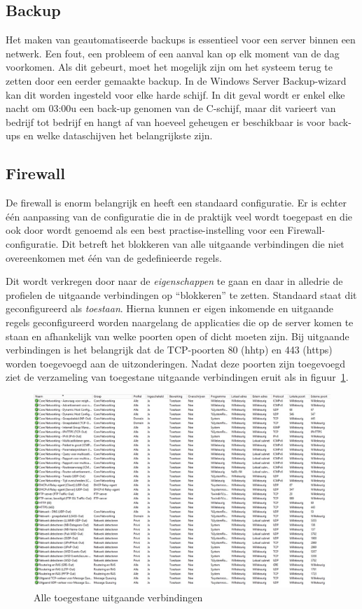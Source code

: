 \documentclass[pdftex,a4paper,12pt]{report}
\begin{document}
\subsection{Backup}
Het maken van geautomatiseerde backups is essentieel voor een server binnen een netwerk. Een fout, een probleem of een aanval kan op elk moment van de dag voorkomen. Als dit gebeurt, moet het mogelijk zijn om het systeem terug te zetten door een eerder gemaakte backup. In de Windows Server Backup-wizard kan dit worden ingesteld voor elke harde schijf. In dit geval wordt er enkel elke nacht om 03:00u een back-up genomen van de C-schijf, maar dit varieert van bedrijf tot bedrijf en hangt af van hoeveel geheugen er beschikbaar is voor back-ups en welke dataschijven het belangrijkste zijn. 

\subsection{Firewall}
De firewall is enorm belangrijk en heeft een standaard configuratie. Er is echter één aanpassing van de configuratie die in de praktijk veel wordt toegepast en die ook door \cite{Nabors2013} wordt genoemd als een best practise-instelling voor een Firewall-configuratie. Dit betreft het blokkeren van alle uitgaande verbindingen die niet overeenkomen met één van de gedefinieerde regels. \newline 

Dit wordt verkregen door naar de \textit{eigenschappen} te gaan en daar in alledrie de profielen de uitgaande verbindingen op "`blokkeren"' te zetten. Standaard staat dit geconfigureerd als \textit{toestaan}. Hierna kunnen er eigen inkomende en uitgaande regels geconfigureerd worden naargelang de applicaties die op de server komen te staan en afhankelijk van welke poorten open of dicht moeten zijn. Bij uitgaande verbindingen is het belangrijk dat de TCP-poorten 80 (hhtp) en 443 (https) worden toegevoegd aan de uitzonderingen. Nadat deze poorten zijn toegevoegd ziet de verzameling van toegestane uitgaande verbindingen eruit als in figuur~\ref{img:FirewallUitgaand}.

\begin{figure}[H]
\begin{center}
\includegraphics[scale=0.45]{img/FirewallUitgaand}
\end{center}
\caption{Alle toegestane uitgaande verbindingen}
\label{img:FirewallUitgaand}
\end{figure}
\end{document}
